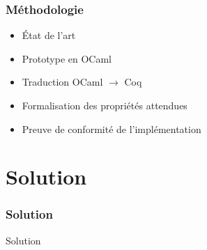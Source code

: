 \documentclass[xetex]{beamer}
\newcommand{\newsection}[1]{
\section{#1}
\begin{frame}
  \frametitle{#1}
  \begin{center}
    {\Huge #1}
  \end{center}
\end{frame}
}
\begin{document}
\begin{frame}[fragile]

\frametitle{Méthodologie}

\begin{itemize}

\item État de l'art

\pause

\item Prototype en OCaml

\pause

\item Traduction OCaml $\rightarrow$ Coq

\pause

\item Formalisation des propriétés attendues

\pause

\item Preuve de conformité de l'implémentation

\end{itemize}

\end{frame}


\newsection{Solution}
\end{document}
